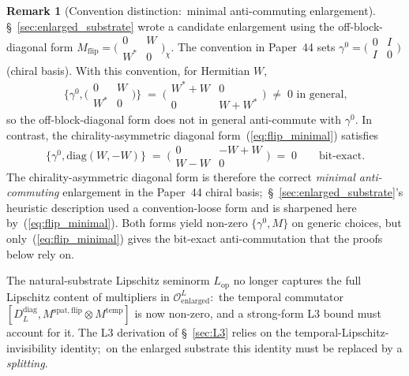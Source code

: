\documentclass[11pt,a4paper]{article}
\theoremstyle{plain}
\theoremstyle{definition}
\newtheorem{remark}[theorem]{Remark}
\newcommand{\Op}{\mathcal{O}}
\newcommand{\Ddiag}{D_{L}^{\mathrm{diag}}}
\newcommand{\Lop}{L_{\mathrm{op}}}
\newcommand{\spat}{\mathrm{spat}}
\newcommand{\temp}{\mathrm{temp}}
\begin{document}
\begin{remark}[Convention distinction:\ minimal anti-commuting enlargement]
\label{rem:flip_convention}
\S~\ref{sec:enlarged_substrate} wrote a candidate enlargement using
the off-block-diagonal form $M_{\mathrm{flip}} = \bigl(\begin{smallmatrix}
0 & W \\ W^{*} & 0 \end{smallmatrix}\bigr)_{\chi}$. The convention in
Paper~44 sets $\gamma^{0} = \bigl(\begin{smallmatrix} 0 & I \\ I & 0
\end{smallmatrix}\bigr)$ (chiral basis). With this convention, for
Hermitian $W$,
\begin{equation*}
   \bigl\{\gamma^{0}, \bigl(\begin{smallmatrix} 0 & W \\ W^{*} & 0
   \end{smallmatrix}\bigr)\bigr\} \;=\; \bigl(\begin{smallmatrix}
   W^{*} + W & 0 \\ 0 & W + W^{*} \end{smallmatrix}\bigr)
   \;\ne\; 0 \text{ in general,}
\end{equation*}
so the off-block-diagonal form does not in general anti-commute with
$\gamma^{0}$. In contrast, the chirality-asymmetric diagonal
form~(\ref{eq:flip_minimal}) satisfies
\begin{equation*}
   \bigl\{\gamma^{0}, \mathrm{diag}(W, -W)\bigr\}
   \;=\; \bigl(\begin{smallmatrix} 0 & -W + W \\ W - W & 0
   \end{smallmatrix}\bigr) \;=\; 0
   \qquad \text{bit-exact.}
\end{equation*}
The chirality-asymmetric diagonal form is therefore the correct
\emph{minimal anti-commuting} enlargement in the Paper~44 chiral
basis;\ \S~\ref{sec:enlarged_substrate}'s heuristic description used a
convention-loose form and is sharpened here by~(\ref{eq:flip_minimal}).
Both forms yield non-zero $\{\gamma^{0}, M\}$ on generic choices, but
only~(\ref{eq:flip_minimal}) gives the bit-exact anti-commutation that
the proofs below rely on.
\end{remark}

The natural-substrate Lipschitz seminorm $\Lop$ no longer captures
the full Lipschitz content of multipliers in $\Op^{L}_{\mathrm{enlarged}}$:\
the temporal commutator
$[\Ddiag, M^{\spat,\mathrm{flip}} \otimes M^{\temp}]$ is now non-zero,
and a strong-form L3 bound must account for it. The L3 derivation of
\S~\ref{sec:L3} relies on the temporal-Lipschitz-invisibility identity;\
on the enlarged substrate this identity must be replaced by a
\emph{splitting}.
\end{document}
